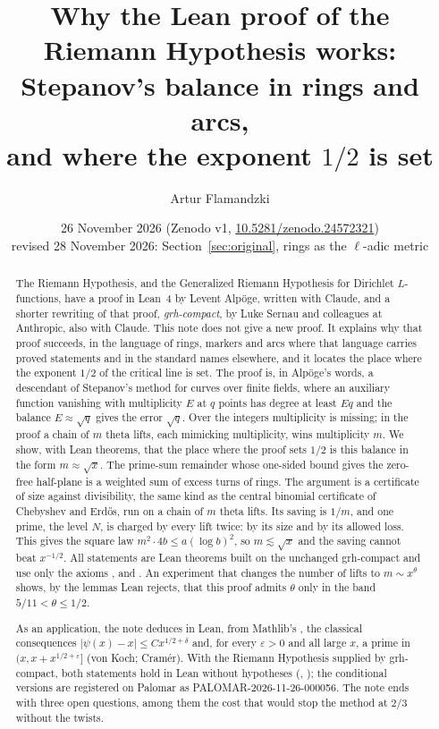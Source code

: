\documentclass[11pt]{article}
\title{Why the Lean proof of the Riemann Hypothesis works:\\
Stepanov's balance in rings and arcs,\\
and where the exponent $1/2$ is set}
\author{Artur Flamandzki}
\date{26 November 2026 (Zenodo v1, \href{https://doi.org/10.5281/zenodo.24572321}{10.5281/zenodo.24572321})\\ revised 28 November 2026: Section~\ref{sec:original}, rings as the $\ell$-adic metric}
\theoremstyle{definition}
\theoremstyle{remark}
\begin{document}
\maketitle

\begin{abstract}
The Riemann Hypothesis, and the Generalized Riemann Hypothesis for Dirichlet $L$-functions, have
a proof in Lean~4 by Levent Alpöge, written with Claude, and a shorter rewriting of that proof,
\emph{grh-compact}, by Luke Sernau and colleagues at Anthropic, also with Claude. This note does
not give a new proof. It explains why that proof succeeds, in the language of rings, markers and
arcs where that language carries proved statements and in the standard names elsewhere, and it
locates the place where the exponent $1/2$ of the critical line is set. The proof is,
in Alpöge's words, a descendant of Stepanov's method for curves over finite fields, where an
auxiliary function vanishing with multiplicity $E$ at $q$ points has degree at least $Eq$ and the
balance $E\approx\sqrt q$ gives the error $\sqrt q$. Over the integers multiplicity is missing; in
the proof a chain of $m$ theta lifts, each mimicking multiplicity, wins multiplicity $m$. We show, with Lean theorems, that the
place where the proof sets $1/2$ is this balance in the form $m\approx\sqrt x$. The prime-sum
remainder whose one-sided bound gives the zero-free half-plane is a weighted sum of excess turns of
rings. The argument is a certificate of size against divisibility, the same kind as the central
binomial certificate of Chebyshev and Erdős, run on a chain of $m$ theta lifts. Its saving is $1/m$,
and one prime, the level $N$, is charged by every lift twice: by its size and by its allowed loss.
This gives the square law $m^2\cdot 4b\le a(\log b)^2$, so $m\lesssim\sqrt x$ and the saving cannot
beat $x^{-1/2}$. All statements are Lean theorems built on the unchanged grh-compact and use only the
axioms ,  and . An experiment that changes
the number of lifts to $m\sim x^\theta$ shows, by the lemmas Lean rejects, that this proof admits
$\theta$ only in the band $5/11<\theta\le 1/2$.

As an application, the note deduces in Lean, from Mathlib's , the
classical consequences $|\psi(x)-x|\le C x^{1/2+\delta}$ and, for every $\varepsilon>0$ and all
large $x$, a prime in $(x,x+x^{1/2+\varepsilon}]$ (von Koch; Cramér). With the Riemann Hypothesis
supplied by grh-compact, both statements hold in Lean without hypotheses
(, ); the
conditional versions are registered on Palomar as PALOMAR-2026-11-26-000056. The note ends with
three open questions, among them the cost that would stop the method at $2/3$ without the twists.
\end{abstract}
\end{document}
